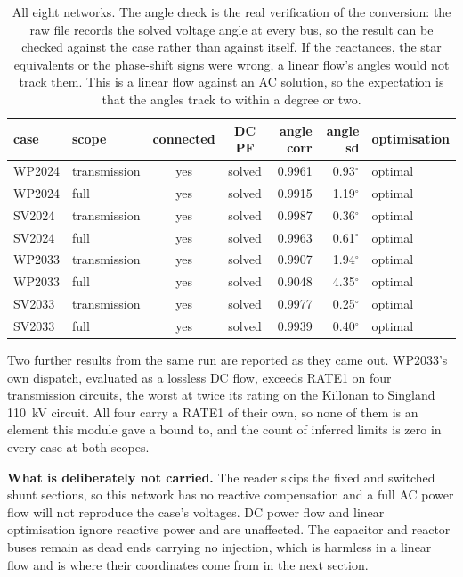 \documentclass[11pt,a4paper]{article}
\begin{document}
\begin{table}[H]\centering\small
\begin{tabular}{llccrrl}
\toprule
\textbf{case} & \textbf{scope} & \textbf{connected} & \textbf{DC PF} &
\textbf{angle corr} & \textbf{angle sd} & \textbf{optimisation} \\
\midrule
WP2024 & transmission & yes & solved & 0.9961 & 0.93$^\circ$ & optimal \\
WP2024 & full         & yes & solved & 0.9915 & 1.19$^\circ$ & optimal \\
SV2024 & transmission & yes & solved & 0.9987 & 0.36$^\circ$ & optimal \\
SV2024 & full         & yes & solved & 0.9963 & 0.61$^\circ$ & optimal \\
WP2033 & transmission & yes & solved & 0.9907 & 1.94$^\circ$ & optimal \\
WP2033 & full         & yes & solved & 0.9048 & 4.35$^\circ$ & optimal \\
SV2033 & transmission & yes & solved & 0.9977 & 0.25$^\circ$ & optimal \\
SV2033 & full         & yes & solved & 0.9939 & 0.40$^\circ$ & optimal \\
\bottomrule
\end{tabular}
\caption{All eight networks. The angle check is the real verification of the
conversion: the raw file records the solved voltage angle at every bus, so the
result can be checked against the case rather than against itself. If the
reactances, the star equivalents or the phase-shift signs were wrong, a linear
flow's angles would not track them. This is a linear flow against an AC
solution, so the expectation is that the angles track to within a degree or
two.}
\end{table}

Two further results from the same run are reported as they came out.
WP2033's own dispatch, evaluated as a lossless DC flow, exceeds RATE1 on four
transmission circuits, the worst at twice its rating on the Killonan to
Singland 110~kV circuit. All four carry a RATE1 of their own, so none of them is
an element this module gave a bound to, and the count of inferred limits is zero
in every case at both scopes.

\textbf{What is deliberately not carried.} The reader skips the fixed and
switched shunt sections, so this network has no reactive compensation and a
full AC power flow will not reproduce the case's voltages. DC power flow and
linear optimisation ignore reactive power and are unaffected. The capacitor and
reactor buses remain as dead ends carrying no injection, which is harmless in a
linear flow and is where their coordinates come from in the next section.
\end{document}
